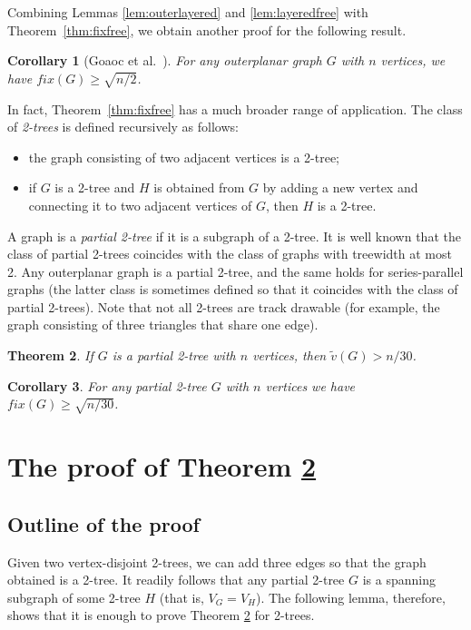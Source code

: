 \documentclass[reqno,12pt]{amsart}
\newcommand{\fix}[1]{\mathit{fix}(#1)}
\newcommand{\free}[1]{\tilde v(#1)}
\newtheorem{theorem}{Theorem}[section]
\newtheorem{corollary}[theorem]{Corollary}
\begin{document}
Combining Lemmas \ref{lem:outerlayered} and \ref{lem:layeredfree} with Theorem~\ref{thm:fixfree},
we obtain another proof for the following result.

\begin{corollary}[Goaoc et al.~\cite{merged}]\label{cor:outer}
For any outerplanar graph $G$ with $n$ vertices, we have $\fix G\ge \sqrt{n/2}$.
\end{corollary}

In fact, Theorem~\ref{thm:fixfree} has a much broader range of application.
The class of \emph{2-trees} is defined recursively as follows:
\begin{itemize}
\item
the graph consisting of two adjacent vertices is a 2-tree;
\item
if $G$ is a 2-tree and $H$ is obtained from $G$ by adding a new
vertex and connecting it to two adjacent vertices of $G$,
then $H$ is a 2-tree.
\end{itemize}
A graph is a \emph{partial 2-tree} if it is a subgraph of a 2-tree.
It is well known that the class of partial 2-trees coincides
with the class of graphs with treewidth at most 2.
Any outerplanar graph is a partial 2-tree, and the same holds
for series-parallel graphs (the latter class is sometimes defined
so that it coincides with the class of partial 2-trees).
Note that not all 2-trees are track drawable (for example, the graph
consisting of three triangles that share one edge).

\begin{theorem}\label{thm:2trees}
If $G$ is a partial 2-tree with $n$ vertices, then $\displaystyle\free G>n/30$.
\end{theorem}

\begin{corollary}\label{cor:2trees}
For any partial 2-tree $G$ with $n$ vertices we have $\fix G\ge \sqrt{n/30}$.
\end{corollary}


\section{The proof of Theorem \protect\ref{thm:2trees}}\label{s:2trees}

\subsection{Outline of the proof}

Given two vertex-disjoint 2-trees, we can add three edges so that the graph
obtained is a 2-tree. It readily follows that any partial 2-tree $G$ is
a spanning subgraph of some 2-tree $H$ (that is, $V_G=V_H$).
The following lemma, therefore, shows that it is enough to prove Theorem \ref{thm:2trees}
for 2-trees.
\end{document}
